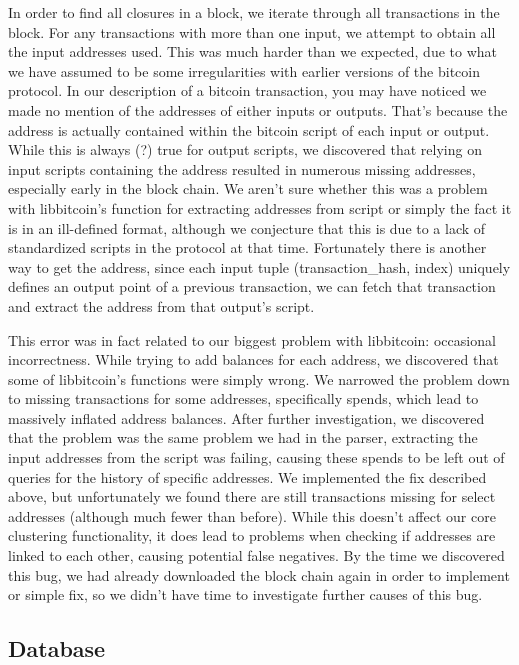 \documentclass[10pt, letterpaper, twocolumn, twoside]{article}
\begin{document}
In order to find all closures in a block, we iterate through all transactions in the block. For any transactions with more than one input, we attempt to obtain all the input addresses used. This was much harder than we expected, due to what we have assumed to be some irregularities with earlier versions of the bitcoin protocol. In our description of a bitcoin transaction, you may have noticed we made no mention of the addresses of either inputs or outputs. That's because the address is actually contained within the bitcoin script of each input or output. While this is always (?) true for output scripts, we discovered that relying on input scripts containing the address resulted in numerous missing addresses, especially early in the block chain. We aren't sure whether this was a problem with libbitcoin's function for extracting addresses from script or simply the fact it is in an ill-defined format, although we conjecture that this is due to a lack of standardized scripts in the protocol at that time. Fortunately there is another way to get the address, since each input tuple (transaction\_hash, index) uniquely defines an output point of a previous transaction, we can fetch that transaction and extract the address from that output's script. 

This error was in fact related to our biggest problem with libbitcoin: occasional incorrectness. While trying to add balances for each address, we discovered that some of libbitcoin's functions were simply wrong. We narrowed the problem down to missing transactions for some addresses, specifically spends, which lead to massively inflated address balances. After further investigation, we discovered that the problem was the same problem we had in the parser, extracting the input addresses from the script was failing, causing these spends to be left out of queries for the history of specific addresses. We implemented the fix described above, but unfortunately we found there are still transactions missing for select addresses (although much fewer than before). While this doesn't affect our core clustering functionality, it does lead to problems when checking if addresses are linked to each other, causing potential false negatives. By the time we discovered this bug, we had already downloaded the block chain again in order to implement or simple fix, so we didn't have time to investigate further causes of this bug.

\subsection{Database}
\end{document}
